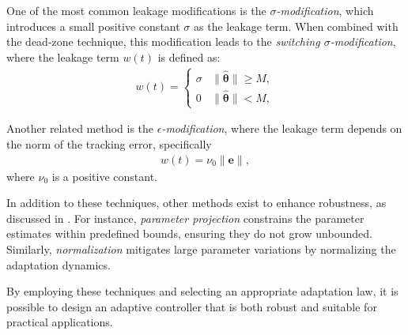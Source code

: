 One of the most common leakage modifications is the \emph{$\sigma$-modification}, which introduces a small positive constant $\sigma$ as the leakage term. When combined with the dead-zone technique, this modification leads to the \emph{switching $\sigma$-modification}, where the leakage term $w(t)$ is defined as:
\begin{align}
    w(t) = \begin{cases}
        \sigma & \|\widehat{\boldsymbol{\theta}}\| \ge M,\\
        0 & \|\widehat{\boldsymbol{\theta}}\| < M,
    \end{cases}
\end{align}

Another related method is the \emph{$\epsilon$-modification}, where the leakage term depends on the norm of the tracking error, specifically
\begin{align}
    w(t) = \nu_0\|\mathbf{e}\|,
\end{align}
where $\nu_0$ is a positive constant.

In addition to these techniques, other methods exist to enhance robustness, as discussed in \citet[ch. 8]{Ioannou2012}. For instance, \emph{parameter projection} constrains the parameter estimates within predefined bounds, ensuring they do not grow unbounded. Similarly, \emph{normalization} mitigates large parameter variations by normalizing the adaptation dynamics.

By employing these techniques and selecting an appropriate adaptation law, it is possible to design an adaptive controller that is both robust and suitable for practical applications.